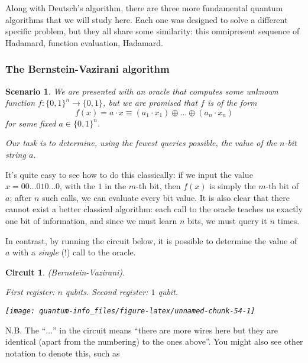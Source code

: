 \documentclass[fleqn]{article}
\newtheorem*{scenario}{Scenario}
\newtheorem*{circuit}{Circuit}
\begin{document}
Along with Deutsch's algorithm, there are three more fundamental quantum algorithms that we will study here.
Each one was designed to solve a different specific problem, but they all share some similarity: this omnipresent sequence of Hadamard, function evaluation, Hadamard.

\hypertarget{the-bernstein-vazirani-algorithm}{%
\subsubsection{The Bernstein-Vazirani algorithm}\label{the-bernstein-vazirani-algorithm}}

\begin{scenario}

We are presented with an oracle that computes some unknown function \(f\colon\{0,1\}^n\to\{0,1\}\), but we are promised that \(f\) is of the form
\[
  f(x) = a\cdot x
  \equiv (a_1\cdot x_1) \oplus \ldots \oplus (a_n\cdot x_n)
\]
for some fixed \(a\in\{0,1\}^n\).

Our task is to determine, using the fewest queries possible, the value of the \(n\)-bit string \(a\).

\end{scenario}

It's quite easy to see how to do this classically: if we input the value \(x=00\ldots010\ldots0\), with the \(1\) in the \(m\)-th bit, then \(f(x)\) is simply the \(m\)-th bit of \(a\); after \(n\) such calls, we can evaluate every bit value.
It is also clear that there cannot exist a better classical algorithm: each call to the oracle teaches us exactly one bit of information, and since we must learn \(n\) bits, we must query it \(n\) times.

In contrast, by running the circuit below, it is possible to determine the value of \(a\) with a \emph{single} (!) call to the oracle.

\begin{circuit}

(Bernstein-Vazirani).

\emph{First register: \(n\) qubits. Second register: \(1\) qubit.}

\begin{center}\texttt{[image: quantum-info\_files/figure-latex/unnamed-chunk-54-1]} \end{center}

\end{circuit}

N.B. The ``\(\ldots\)'' in the circuit means ``there are more wires here but they are identical (apart from the numbering) to the ones above''.
You might also see other notation to denote this, such as
\end{document}
